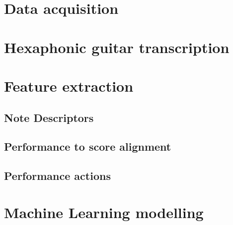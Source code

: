 \section{Data acquisition}
\section{Hexaphonic guitar transcription}


\section{Feature extraction}


\subsection{Note Descriptors}


\subsection{Performance to score alignment}
\subsection{Performance actions}
\section{Machine Learning modelling}

\newpage


